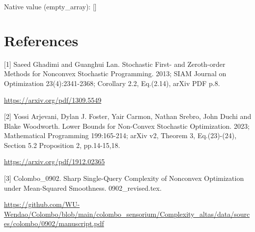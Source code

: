 \documentclass[10pt,a4paper]{article}
\begin{document}
Native value (empty\_array): []



\section{References}


[1] Saeed Ghadimi and Guanghui Lan. Stochastic First- and Zeroth-order Methods for Nonconvex Stochastic Programming. 2013; SIAM Journal on Optimization 23(4):2341-2368; Corollary 2.2, Eq.(2.14), arXiv PDF p.8.



\url{https://arxiv.org/pdf/1309.5549}



[2] Yossi Arjevani, Dylan J. Foster, Yair Carmon, Nathan Srebro, John Duchi and Blake Woodworth. Lower Bounds for Non-Convex Stochastic Optimization. 2023; Mathematical Programming 199:165-214; arXiv v2, Theorem 3, Eq.(23)-(24), Section 5.2 Proposition 2, pp.14-15,18.



\url{https://arxiv.org/pdf/1912.02365}



[3] Colombo\_0902. Sharp Single-Query Complexity of Nonconvex Optimization under Mean-Squared Smoothness. 0902\_revised.tex.



\url{https://github.com/WU-Wendao/Colombo/blob/main/colombo_sensorium/Complexity_altas/data/sources/colombo/0902/manuscript.pdf}
\end{document}
